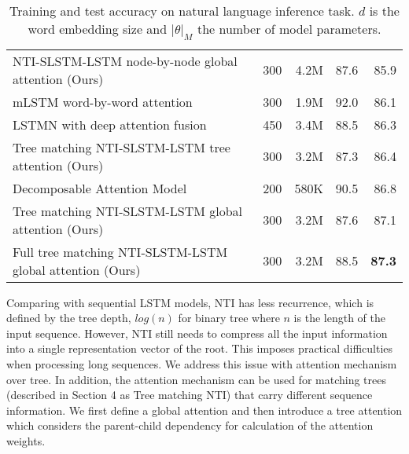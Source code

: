 \documentclass[11pt]{article}
\begin{document}
\begin{table*}[t]
\begin{center}
\begin{tabular}{c|c|c|c|c}
\multicolumn{1}{l|}{NTI-SLSTM-LSTM node-by-node global attention (Ours)} & \multicolumn{1}{|r|}{300} & \multicolumn{1}{|r|}{4.2M} & \multicolumn{1}{|r|}{87.6} & \multicolumn{1}{|r}{85.9} \\
\multicolumn{1}{l|}{mLSTM word-by-word attention \cite{WangJ15b}} & \multicolumn{1}{|r|}{300} & \multicolumn{1}{|r|}{1.9M} & \multicolumn{1}{|r|}{92.0} & \multicolumn{1}{|r}{86.1} \\
\multicolumn{1}{l|}{LSTMN with deep attention fusion \cite{ChengDL16}} & \multicolumn{1}{|r|}{450} & \multicolumn{1}{|r|}{3.4M} & \multicolumn{1}{|r|}{88.5} & \multicolumn{1}{|r}{86.3} \\
\multicolumn{1}{l|}{Tree matching NTI-SLSTM-LSTM tree attention (Ours)} & \multicolumn{1}{|r|}{300} & \multicolumn{1}{|r|}{3.2M} & \multicolumn{1}{|r|}{87.3} & \multicolumn{1}{|r}{86.4} \\
\multicolumn{1}{l|}{Decomposable Attention Model \cite{parikh2016decomposable}} & \multicolumn{1}{|r|}{200} & \multicolumn{1}{|r|}{580K} & \multicolumn{1}{|r|}{90.5} & \multicolumn{1}{|r}{86.8} \\
\multicolumn{1}{l|}{Tree matching NTI-SLSTM-LSTM global attention (Ours)} & \multicolumn{1}{|r|}{300} & \multicolumn{1}{|r|}{3.2M} & \multicolumn{1}{|r|}{87.6} & \multicolumn{1}{|r}{87.1} \\
\multicolumn{1}{l|}{Full tree matching NTI-SLSTM-LSTM global attention (Ours)} & \multicolumn{1}{|r|}{300} & \multicolumn{1}{|r|}{3.2M} & \multicolumn{1}{|r|}{88.5} & \multicolumn{1}{|r}{\textbf{87.3}} \\
\hline
\end{tabular}
\end{center}
\caption{\label{table:snli}Training and test accuracy on natural language inference task. $d$ is the word embedding size and $|\theta|_M$ the number of model parameters.}
\end{table*}

Comparing with sequential LSTM models, NTI has less recurrence, which is defined by the tree depth, $log(n)$ for binary tree where $n$ is the length of the input sequence. However, NTI still needs to compress all the input information into a single representation vector of the root. This imposes practical difficulties when processing long sequences. We address this issue with attention mechanism over tree. In addition, the attention mechanism can be used for matching trees (described in Section 4 as Tree matching NTI) that carry different sequence information. We first define a global attention and then introduce a tree attention which considers the parent-child dependency for calculation of the attention weights.
\end{document}
